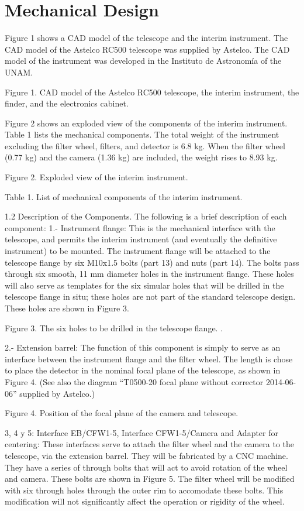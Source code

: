 \section{Mechanical Design}

Figure 1 shows a CAD model of the telescope and the interim instrument. The CAD model of the Astelco RC500 telescope was supplied by Astelco. The CAD model of the instrument was developed in the Instituto de Astronomía of the UNAM.

Figure 1. CAD model of the Astelco RC500 telescope, the interim instrument, the finder, and the electronics cabinet.


Figure 2 shows an exploded view of the components of the interim instrument. Table 1 lists the mechanical components. The total weight of the instrument excluding the filter wheel, filters, and detector is 6.8 kg. When the filter wheel (0.77 kg) and the camera (1.36 kg) are included, the weight rises to 8.93 kg. 

Figure 2. Exploded view of the interim instrument.


Table 1. List of mechanical components of the interim instrument.

1.2  Description of the Components.
The following is a brief description of each component:
1.- Instrument flange: This is the mechanical interface with the telescope, and permits the interim instrument (and eventually the definitive instrument) to be mounted. The instrument flange will be attached to the telescope flange by six M10x1.5 bolts (part 13) and nuts (part 14). The bolts pass through six smooth, 11 mm diameter holes in the instrument flange. These holes will also serve as templates for the six simular holes that will be drilled in the telescope flange in situ; these holes are not part of the standard telescope design. These holes are shown in Figure 3.
   
Figure 3. The six holes to be drilled in the telescope flange.
.

2.- Extension barrel: The function of this component is simply to serve as an interface between the instrument flange and the filter wheel. The length is chose to place the detector in the nominal focal plane of the telescope, as shown in Figure 4. (See also the diagram “T0500-20 focal plane without corrector 2014-06-06” supplied by Astelco.)


Figure 4. Position of the focal plane of the camera and telescope.


3, 4 y 5: Interface EB/CFW1-5, Interface CFW1-5/Camera and Adapter for centering: These interfaces serve to attach the filter wheel and the camera to the telescope, via the extension barrel. They will be fabricated by a CNC machine. They have a series of through bolts that will act to avoid rotation of the wheel and camera. These bolts are shown in Figure 5. The filter wheel will be modified with six through holes through the outer rim to accomodate these bolts. This modification will not significantly affect the operation or rigidity of the wheel.

